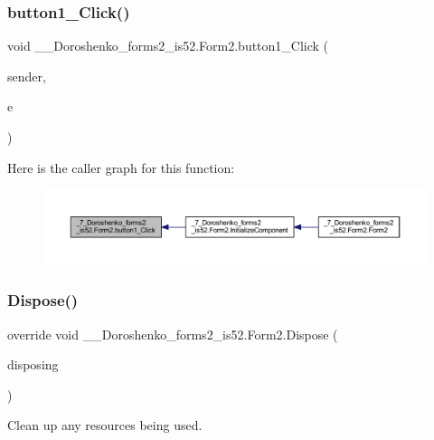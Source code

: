 \subsubsection{\texorpdfstring{button1\+\_\+\+Click()}{button1\_Click()}}
{\footnotesize\ttfamily void \+\_\+\_\+\+Doroshenko\+\_\+forms2\+\_\+is52.\+Form2.\+button1\+\_\+\+Click (\begin{DoxyParamCaption}\item[{object}]{sender,  }\item[{Event\+Args}]{e }\end{DoxyParamCaption})\hspace{0.3cm}{\ttfamily [private]}}

Here is the caller graph for this function\+:
\nopagebreak
\begin{figure}[H]
\begin{center}
\leavevmode
\includegraphics[width=350pt]{class__7___doroshenko__forms2__is52_1_1_form2_af791f000673bcc783827356e3fae5ce8_icgraph}
\end{center}
\end{figure}
\hypertarget{class__7___doroshenko__forms2__is52_1_1_form2_a703263905c77adfc722a785b0a931826}{}\label{class__7___doroshenko__forms2__is52_1_1_form2_a703263905c77adfc722a785b0a931826} 
\subsubsection{\texorpdfstring{Dispose()}{Dispose()}}
{\footnotesize\ttfamily override void \+\_\+\_\+\+Doroshenko\+\_\+forms2\+\_\+is52.\+Form2.\+Dispose (\begin{DoxyParamCaption}\item[{bool}]{disposing }\end{DoxyParamCaption})\hspace{0.3cm}{\ttfamily [protected]}}



Clean up any resources being used. 


